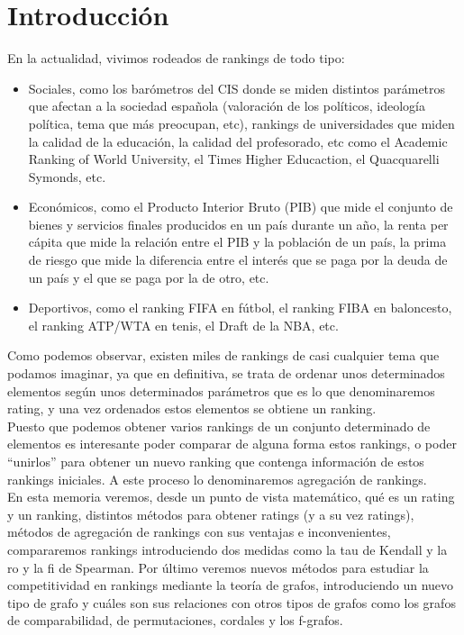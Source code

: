 \chapter{Introducción} \label{chp:introduccion}


En la actualidad, vivimos rodeados de rankings de todo tipo: 
\begin{itemize}
\item Sociales, como los barómetros del CIS donde se miden distintos parámetros que afectan a la sociedad española (valoración de los políticos, ideología política, tema que más preocupan, etc), rankings de universidades que miden la calidad de la educación, la calidad del profesorado, etc como el Academic Ranking of World University, el Times Higher Educaction, el Quacquarelli Symonds, etc.
\item Económicos, como el Producto Interior Bruto (PIB) que mide el conjunto de bienes y servicios finales producidos en un país durante un año, la renta per cápita que mide la relación entre el PIB y la población de un país, la prima de riesgo que mide la diferencia entre el interés que se paga por la deuda de un país y el que se paga por la de otro, etc.
\item Deportivos, como el ranking FIFA en fútbol, el ranking FIBA en baloncesto, el ranking ATP/WTA en tenis, el Draft de la NBA, etc.
\end{itemize}

Como podemos observar, existen miles de rankings de casi cualquier tema que podamos imaginar, ya que en definitiva, se trata de ordenar unos determinados elementos según unos determinados parámetros que es lo que denominaremos rating, y una vez ordenados estos elementos se obtiene un ranking.\\

Puesto que podemos obtener varios rankings de un conjunto determinado de elementos es interesante poder comparar de alguna forma estos rankings, o poder ``unirlos'' para obtener un nuevo ranking que contenga información de estos rankings iniciales. A este proceso lo denominaremos agregación de rankings.\\

En esta memoria veremos, desde un punto de vista matemático, qué es un rating y un ranking, distintos métodos para obtener ratings (y a su vez ratings), métodos de agregación de rankings con sus ventajas e inconvenientes, compararemos rankings introduciendo dos medidas como la tau de Kendall y la ro y la fi de Spearman. Por último veremos nuevos métodos para estudiar la competitividad en rankings mediante la teoría de grafos, introduciendo un nuevo tipo de grafo y cuáles son sus relaciones con otros tipos de grafos como los grafos de comparabilidad, de permutaciones, cordales y los f-grafos.